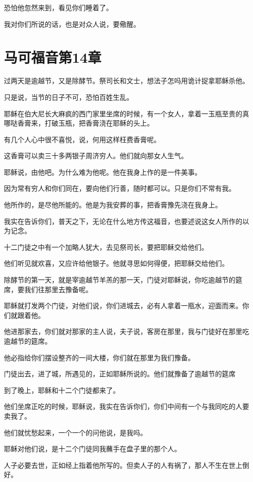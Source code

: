 \documentclass[12pt,oneside]{book}
\begin{document}
恐怕他忽然来到，看见你们睡着了。

我对你们所说的话，也是对众人说，要儆醒。

\chapter{马可福音第14章}
过两天是逾越节，又是除酵节。祭司长和文士，想法子怎吗用诡计捉拿耶稣杀他。

只是说，当节的日子不可，恐怕百姓生乱。

耶稣在伯大尼长大麻疯的西门家里坐席的时候，有一个女人，拿着一玉瓶至贵的真哪哒香膏来，打破玉瓶，把香膏浇在耶稣的头上。

有几个人心中很不喜悦，说，何用这样枉费香膏呢。

这香膏可以卖三十多两银子周济穷人。他们就向那女人生气。

耶稣说，由他吧。为什么难为他呢。他在我身上作的是一件美事。

因为常有穷人和你们同在，要向他们行善，随时都可以。只是你们不常有我。

他所作的，是尽他所能的。他是为我安葬的事，把香膏豫先浇在我身上。

我实在告诉你们，普天之下，无论在什么地方传这福音，也要述说这女人所作的以为记念。

十二门徒之中有一个加略人犹大，去见祭司长，要把耶稣交给他们。

他们听见就欢喜，又应许给他银子。他就寻思如何得便，把耶稣交给他们。

除酵节的第一天，就是宰逾越节羊羔的那一天，门徒对耶稣说，你吃逾越节的筵席，要我们往那里去豫备呢。

耶稣就打发两个门徒，对他们说，你们进城去，必有人拿着一瓶水，迎面而来。你们就跟着他。

他进那家去，你们就对那家的主人说，夫子说，客房在那里，我与门徒好在那里吃逾越节的筵席。

他必指给你们摆设整齐的一间大楼，你们就在那里为我们豫备。

门徒出去，进了城，所遇见的，正如耶稣所说的。他们就豫备了逾越节的筵席

到了晚上，耶稣和十二个门徒都来了。

他们坐席正吃的时候，耶稣说，我实在告诉你们，你们中间有一个与我同吃的人要卖我了。

他们就忧愁起来，一个一个的问他说，是我吗。

耶稣对他们说，是十二个门徒同我蘸手在盘子里的那个人。

人子必要去世，正如经上指着他所写的。但卖人子的人有祸了，那人不生在世上倒好。
\end{document}
